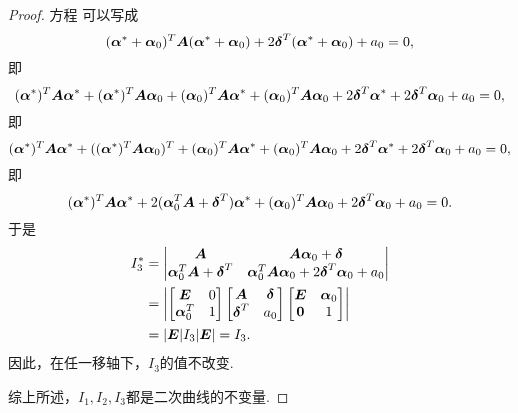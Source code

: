 \begin{theorem}
\begin{proof}
方程  可以写成\begin{equation*}
	(\boldsymbol\alpha^* + \boldsymbol\alpha_0)^T
	\boldsymbol{A}
	(\boldsymbol\alpha^* + \boldsymbol\alpha_0)
	+ 2 \boldsymbol\delta^T
	(\boldsymbol\alpha^* + \boldsymbol\alpha_0)
	+ a_0
	= 0,
\end{equation*}
即\begin{equation*}
	(\boldsymbol\alpha^*)^T
	\boldsymbol{A}
	\boldsymbol\alpha^*
	+ (\boldsymbol\alpha^*)^T
	\boldsymbol{A}
	\boldsymbol\alpha_0
	+ (\boldsymbol\alpha_0)^T
	\boldsymbol{A}
	\boldsymbol\alpha^*
	+ (\boldsymbol\alpha_0)^T
	\boldsymbol{A}
	\boldsymbol\alpha_0
	+ 2 \boldsymbol\delta^T \boldsymbol\alpha^*
	+ 2 \boldsymbol\delta^T \boldsymbol\alpha_0
	+ a_0
	= 0,
\end{equation*}
即\begin{equation*}
	(\boldsymbol\alpha^*)^T
	\boldsymbol{A}
	\boldsymbol\alpha^*
	+ (
		(\boldsymbol\alpha^*)^T
		\boldsymbol{A}
		\boldsymbol\alpha_0
	)^T
	+ (\boldsymbol\alpha_0)^T
	\boldsymbol{A}
	\boldsymbol\alpha^*
	+ (\boldsymbol\alpha_0)^T
	\boldsymbol{A}
	\boldsymbol\alpha_0
	+ 2 \boldsymbol\delta^T \boldsymbol\alpha^*
	+ 2 \boldsymbol\delta^T \boldsymbol\alpha_0
	+ a_0
	= 0,
\end{equation*}
即\begin{equation*}
	(\boldsymbol\alpha^*)^T
	\boldsymbol{A}
	\boldsymbol\alpha^*
	+ 2 (\boldsymbol\alpha_0^T \boldsymbol{A} + \boldsymbol\delta^T) \boldsymbol\alpha^*
	+ (\boldsymbol\alpha_0)^T
	\boldsymbol{A}
	\boldsymbol\alpha_0
	+ 2 \boldsymbol\delta^T \boldsymbol\alpha_0
	+ a_0
	= 0.
\end{equation*}
于是\begin{align*}
	I_3^*
	&= \begin{vmatrix}
		\boldsymbol{A} & \boldsymbol{A} \boldsymbol\alpha_0 + \boldsymbol\delta \\
		\boldsymbol\alpha_0^T \boldsymbol{A} + \boldsymbol\delta^T & \boldsymbol\alpha_0^T \boldsymbol{A} \boldsymbol\alpha_0 + 2 \boldsymbol\delta^T \boldsymbol\alpha_0 + a_0
	\end{vmatrix} \\
	&= \abs{
		\begin{bmatrix}
			\boldsymbol{E} & 0 \\
			\boldsymbol\alpha_0^T & 1
		\end{bmatrix}
		\begin{bmatrix}
			\boldsymbol{A} & \boldsymbol\delta \\
			\boldsymbol\delta^T & a_0
		\end{bmatrix}
		\begin{bmatrix}
			\boldsymbol{E} & \boldsymbol\alpha_0 \\
			\boldsymbol0 & 1
		\end{bmatrix}
	} \\
	&= \abs{\boldsymbol{E}} I_3 \abs{\boldsymbol{E}}
	= I_3.
\end{align*}
因此，在任一移轴下，\(I_3\)的值不改变.

综上所述，\(I_1,I_2,I_3\)都是二次曲线的不变量.
\end{proof}
\end{theorem}


